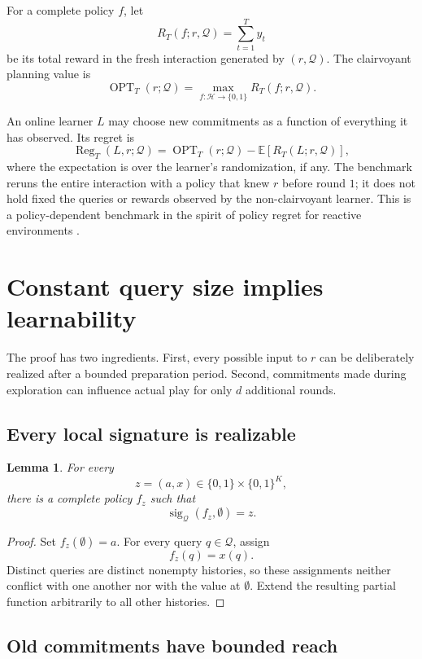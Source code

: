 \documentclass[11pt]{article}
\newtheorem{lemma}[theorem]{Lemma}
\newcommand{\Hh}{\mathcal H}
\newcommand{\QQ}{\mathcal Q}
\newcommand{\OPT}{\operatorname{OPT}}
\newcommand{\Reg}{\operatorname{Reg}}
\newcommand{\sig}{\operatorname{sig}}
\begin{document}
For a complete policy $f$, let
\[
    R_T(f;r,\QQ)=\sum_{t=1}^T y_t
\]
be its total reward in the fresh interaction generated by $(r,\QQ)$.  The clairvoyant planning value is
\[
    \OPT_T(r;\QQ)
    =\max_{f:\Hh\to\{0,1\}} R_T(f;r,\QQ).
\]

An online learner $L$ may choose new commitments as a function of everything it has observed.  Its regret is
\[
    \Reg_T(L,r;\QQ)
    =\OPT_T(r;\QQ)
     -\mathbb E\left[R_T(L;r,\QQ)\right],
\]
where the expectation is over the learner's randomization, if any.  The benchmark reruns the entire interaction with a policy that knew $r$ before round $1$; it does not hold fixed the queries or rewards observed by the non-clairvoyant learner.  This is a policy-dependent benchmark in the spirit of policy regret for reactive environments \cite{AroraDekelTewari2012}.

\section{Constant query size implies learnability}

The proof has two ingredients.  First, every possible input to $r$ can be deliberately realized after a bounded preparation period.  Second, commitments made during exploration can influence actual play for only $d$ additional rounds.

\subsection{Every local signature is realizable}

\begin{lemma}\label{lem:realizable}
For every
\[
    z=(a,x)\in\{0,1\}\times\{0,1\}^{K},
\]
there is a complete policy $f_z$ such that
\[
    \sig_{\QQ}(f_z,\emptyset)=z.
\]
\end{lemma}

\begin{proof}
Set $f_z(\emptyset)=a$.  For every query $q\in\QQ$, assign
\[
    f_z(q)=x(q).
\]
Distinct queries are distinct nonempty histories, so these assignments neither conflict with one another nor with the value at $\emptyset$.  Extend the resulting partial function arbitrarily to all other histories.
\end{proof}

\subsection{Old commitments have bounded reach}
\end{document}
